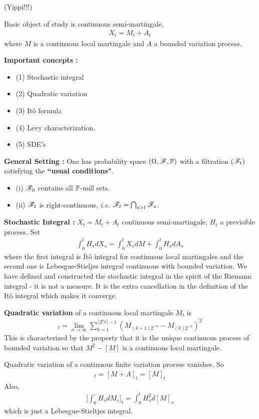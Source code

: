 \documentclass[12pt,a4paper]{article}
\renewenvironment{i}
{\begin{itemize} 
	}%
	{\end{itemize}
}
\begin{document}
(Yippi!!!)

Basic object of study is continuous semi-martingale,
\begin{align*}
X_t = M_t + A_t
\end{align*}
where $M$ is a continuous local martingale and $A$ a bounded variation process.
\s

\textbf{Important concepts :}
\begin{i}
\item[(1)] Stochastic integral
\item[(2)] Quadratic variation
\item[(3)] It\^o formula
\item[(4)] Levy characterization.
\item[(5)] SDE's
\end{i} 
\s

\textbf{General Setting :} One has probability space $(\Omega, \mathscr{F}, \mathbb{P})$ with a filtration $(\mathscr{F}_t)$ satisfying the \textbf{``usual conditions"}.
\begin{i}
\item[(i)] $\mathscr{F}_0$ contains all $\mathbb{P}$-null sets.
\item[(ii)] $\mathscr{F}_t$ is right-continuous, \textit{i.e.} $\mathscr{F}_t =\bigcap_{s>t} \mathscr{F}_s$.
\end{i}
\s

\textbf{Stochastic Integral :} $X_t = M_t + A_t$ continuous semi-martingale, $H_t$ a previsible process. Set 
\begin{align*}
\int_0^t H_s dX_s = \int_0^t X_s dM + \int_0^t H_s dA_s
\end{align*}
where the first integral is It\^o integral for continuous local martingales and the second one is Lebesgue-Stieljes integral continuous with bounded variation. We have defined and constructed the stochastic integral in the spirit of the Riemann integral - it is not a measure. It is the extra cancellation in the definition of the It\^o integral which makes it converge.
\s

\textbf{Quadratic variation} of a continuous local martingale $M_t$ is
\begin{align*}
[M]_t = \lim_{n\rightarrow \infty} \sum_{k=1}^{\lceil 2^nt \rceil -1} (M_{(k+1)2^{-n}} -M_{(k)2^{-n}})^2
\end{align*}
This is characterized by the property that it is the unique continuous process of bounded variation so that $M^2 - [M]$ is a continuous local martingale. 

\quad Quadratic variation of a continuous finite variation process vanishes. So
\begin{align*}
[X]_t = [M+A]_t = [M]_t
\end{align*}
Also,
\begin{align*}
\Big[ \int_0^{\cdot} H_s dM_s \Big]_t = \int_0^t H_s^2 d[M]_s
\end{align*}
which is just a Lebesgue-Stieltjes integral. 
\s
\end{document}
